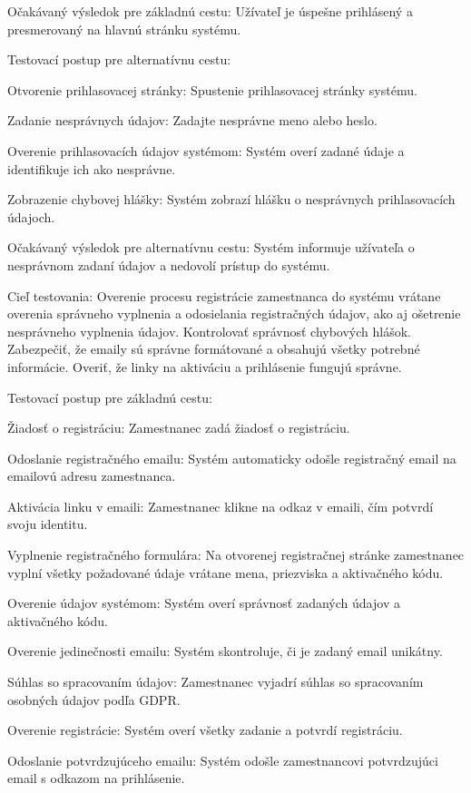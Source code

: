 Očakávaný výsledok pre základnú cestu: Užívateľ je úspešne prihlásený a presmerovaný na hlavnú stránku systému.


\blank
Testovací postup pre alternatívnu cestu:

\startitemize[n]
\item{Otvorenie prihlasovacej stránky: Spustenie prihlasovacej stránky systému.}
\item{Zadanie nesprávnych údajov: Zadajte nesprávne meno alebo heslo.}
\item{Overenie prihlasovacích údajov systémom: Systém overí zadané údaje a identifikuje ich ako nesprávne.}
\item{Zobrazenie chybovej hlášky: Systém zobrazí hlášku o nesprávnych prihlasovacích údajoch.}
\stopitemize

Očakávaný výsledok pre alternatívnu cestu: Systém informuje užívateľa o nesprávnom zadaní údajov a nedovolí prístup do systému.


Cieľ testovania: Overenie procesu registrácie zamestnanca do systému vrátane overenia správneho vyplnenia a odosielania registračných údajov, ako aj ošetrenie nesprávneho vyplnenia údajov. Kontrolovať správnosť chybových hlášok. Zabezpečiť, že emaily sú správne formátované a obsahujú všetky potrebné informácie. Overiť, že linky na aktiváciu a prihlásenie fungujú správne.

\blank
Testovací postup pre základnú cestu:

\startitemize[n]
\item{Žiadosť o registráciu: Zamestnanec zadá žiadosť o registráciu.}
\item{Odoslanie registračného emailu: Systém automaticky odošle registračný email na emailovú adresu zamestnanca.}
\item{Aktivácia linku v emaili: Zamestnanec klikne na odkaz v emaili, čím potvrdí svoju identitu.}
\item{Vyplnenie registračného formulára: Na otvorenej registračnej stránke zamestnanec vyplní všetky požadované údaje vrátane mena, priezviska a aktivačného kódu.}
\item{Overenie údajov systémom: Systém overí správnosť zadaných údajov a aktivačného kódu.}
\item{Overenie jedinečnosti emailu: Systém skontroluje, či je zadaný email unikátny.}
\item{Súhlas so spracovaním údajov: Zamestnanec vyjadrí súhlas so spracovaním osobných údajov podľa GDPR.}
\item{Overenie registrácie: Systém overí všetky zadanie a potvrdí registráciu.}
\item{Odoslanie potvrdzujúceho emailu: Systém odošle zamestnancovi potvrdzujúci email s odkazom na prihlásenie.}
\stopitemize

